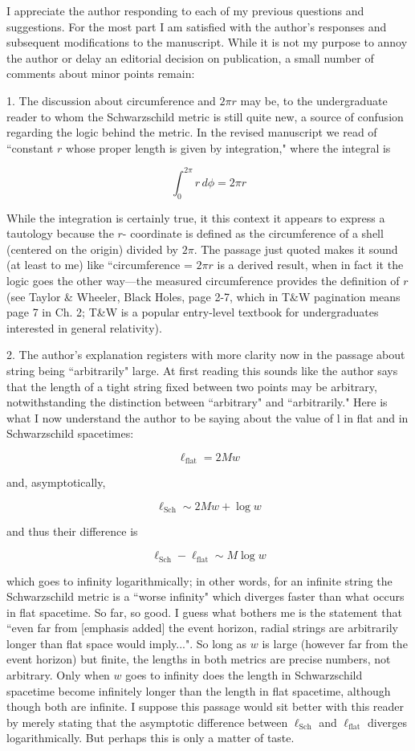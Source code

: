 \documentclass[12pt]{article}
\begin{document}
I appreciate the author responding to each of my previous questions
and suggestions. For the most part I am satisfied with the author’s
responses and subsequent modifications to the manuscript. While it is
not my purpose to annoy the author or delay an editorial decision on
publication, a small number of comments about minor points remain:

1. The discussion about circumference and $2\pi r$ may be, to the
undergraduate reader to whom the Schwarzschild metric is still quite
new, a source of confusion regarding the logic behind the metric. In
the revised manuscript we read of ``constant $r$ whose proper length
is given by integration," where the integral is

\[
\int_{0}^{2\pi} r\,d\phi = 2\pi r
\]


While the integration is certainly true, it this context it appears to
express a tautology because the $r$- coordinate is defined as the
circumference of a shell (centered on the origin) divided by $2\pi$.
The passage just quoted makes it sound (at least to me) like
``circumference = $2\pi r$ is a derived result, when in fact it the
logic goes the other way---the measured circumference provides the
definition of $r$ (see Taylor \& Wheeler, Black Holes, page 2-7, which
in T\&W pagination means page 7 in Ch. 2; T\&W is a popular
entry-level textbook for undergraduates interested in general
relativity).

2. The author's explanation registers with more clarity now in the
passage about string being ``arbitrarily" large.  At first reading
this sounds like the author says that the length of a tight string
fixed between two points may be arbitrary, notwithstanding the
distinction between ``arbitrary" and ``arbitrarily."  Here is what I
now understand the author to be saying about the value of l in flat
and in Schwarzschild spacetimes:

\[
\ell_\mathrm{flat} = 2Mw
\]

and, asymptotically,

\[
\ell_\mathrm{Sch}\sim 2Mw + \log w
\]

and thus their difference is


\[
\ell_\mathrm{Sch} - \ell_\mathrm{flat}\sim M\log w
\]

which goes to infinity logarithmically; in other words, for an
infinite string the Schwarzschild metric is a ``worse infinity" which
diverges faster than what occurs in flat spacetime.  So far, so good.
I guess what bothers me is the statement that ``even far from [emphasis
  added] the event horizon, radial strings are arbitrarily longer than
flat space would imply...".  So long as $w$ is large (however far from
the event horizon) but finite, the lengths in both metrics are precise
numbers, not arbitrary.  Only when $w$ goes to infinity does the
length in Schwarzschild spacetime become infinitely longer than the
length in flat spacetime, although though both are infinite.  I
suppose this passage would sit better with this reader by merely
stating that the asymptotic difference between $\ell_\mathrm{Sch}$ and
$\ell_\mathrm{flat}$ diverges logarithmically.  But perhaps this is
only a matter of taste.
\end{document}
